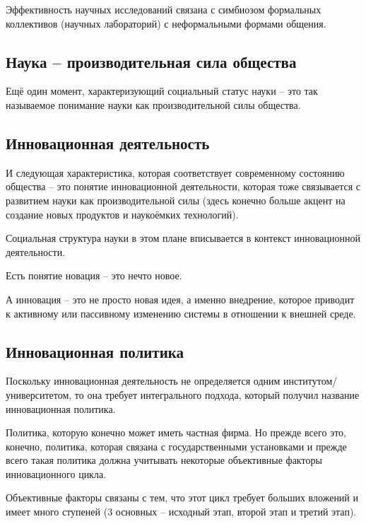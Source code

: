 \documentclass[main.tex]{subfiles}
\begin{document}

Эффективность научных исследований связана с симбиозом формальных коллективов (научных лабораторий) с неформальными формами общения.

\subsection{Наука -- производительная сила общества}


Ещё один момент, характеризующий социальный статус науки -- это так называемое понимание науки как производительной силы общества.

\subsection{Инновационная деятельность}


И следующая характеристика, которая соответствует современному состоянию общества -- это понятие инновационной деятельности, которая тоже связывается с развитием науки как производительной силы (здесь конечно больше акцент на создание новых продуктов и наукоёмких технологий).

Социальная структура науки в этом плане вписывается  в контекст инновационной деятельности.

Есть понятие новация -- это нечто новое.

А инновация -- это не просто новая идея, а именно внедрение, которое приводит к активному или пассивному изменению системы в отношении к внешней среде.

\subsection{Инновационная политика}


Поскольку инновационная деятельность не определяется одним институтом/университетом, то она требует интегрального подхода, который получил название инновационная политика.

Политика, которую конечно может иметь частная фирма.
Но прежде всего это, конечно, политика, которая связана с государственными установками и прежде всего такая политика должна учитывать некоторые объективные факторы инновационного цикла.

Объективные факторы связаны с тем, что этот цикл требует больших вложений и имеет много ступеней (3 основных -- исходный этап, второй этап и третий этап).
\end{document}
